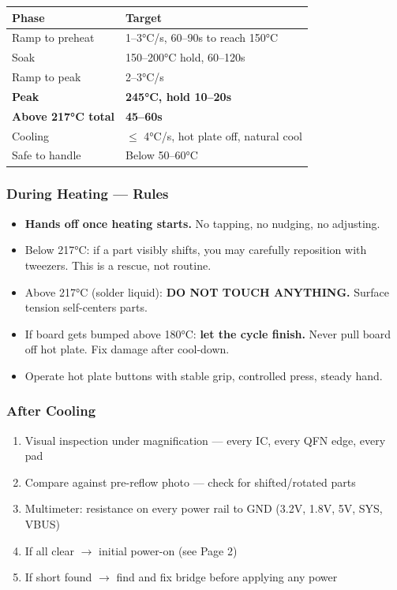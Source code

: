 \documentclass[11pt,a4paper]{article}
\begin{document}
\vspace{-0.5em}
\begin{table}[H]
\centering
\begin{tabular}{@{}ll@{}}
\toprule
\textbf{Phase} & \textbf{Target} \\
\midrule
Ramp to preheat & 1--3°C/s, 60--90s to reach 150°C \\
Soak & 150--200°C hold, 60--120s \\
Ramp to peak & 2--3°C/s \\
\rowcolor{danger!10} \textbf{Peak} & \textbf{245°C, hold 10--20s} \\
\rowcolor{danger!10} \textbf{Above 217°C total} & \textbf{45--60s} \\
Cooling & $\leq$ 4°C/s, hot plate off, natural cool \\
Safe to handle & Below 50--60°C \\
\bottomrule
\end{tabular}
\end{table}

\clearpage

\subsubsection*{During Heating — Rules}
\begin{itemize}[nosep]
\item \textbf{Hands off once heating starts.} No tapping, no nudging, no adjusting.
\item Below 217°C: if a part visibly shifts, you may carefully reposition with tweezers. This is a rescue, not routine.
\item Above 217°C (solder liquid): \textbf{\textcolor{danger}{DO NOT TOUCH ANYTHING.}} Surface tension self-centers parts.
\item If board gets bumped above 180°C: \textbf{let the cycle finish.} Never pull board off hot plate. Fix damage after cool-down.
\item Operate hot plate buttons with stable grip, controlled press, steady hand.
\end{itemize}

\subsubsection*{After Cooling}
\begin{enumerate}[nosep]
\item Visual inspection under magnification — every IC, every QFN edge, every pad
\item Compare against pre-reflow photo — check for shifted/rotated parts
\item Multimeter: resistance on every power rail to GND (3.2V, 1.8V, 5V, SYS, VBUS)
\item If all clear $\rightarrow$ initial power-on (see Page 2)
\item If short found $\rightarrow$ find and fix bridge before applying any power
\end{enumerate}
\end{document}
